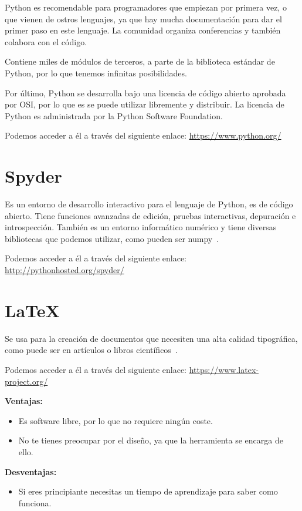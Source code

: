Python es recomendable para programadores que empiezan por primera vez, o que vienen de ostros lenguajes, ya que hay mucha documentación para dar el primer paso en este lenguaje. La comunidad organiza conferencias y también colabora con el código.

Contiene miles de módulos de terceros, a parte de la biblioteca estándar de Python, por lo que tenemos infinitas posibilidades.

Por último, Python se desarrolla bajo una licencia de código abierto aprobada por OSI, por lo que es se puede utilizar libremente y distribuir. La licencia de Python es administrada por la Python Software Foundation. 

Podemos acceder a él a través del siguiente enlace: 
\url{https://www.python.org/}

\section{Spyder}
Es un entorno de desarrollo interactivo para el lenguaje de Python, es de código abierto.
Tiene funciones avanzadas de edición, pruebas interactivas, depuración e introspección. También es un entorno informático numérico y tiene diversas bibliotecas que podemos utilizar, como pueden ser numpy~\cite{spyder}.

Podemos acceder a él a través del siguiente enlace: 
\url{http://pythonhosted.org/spyder/}

\section{\LaTeX}
Se usa para la creación de documentos que necesiten una alta calidad tipográfica, como puede ser en artículos o libros científicos~\cite{latex}.

Podemos acceder a él a través del siguiente enlace: 
\url{https://www.latex-project.org/}

\textbf{Ventajas:}
\begin{itemize}
\item Es software libre, por lo que no requiere ningún coste.
\item No te tienes preocupar por el diseño, ya que la herramienta se encarga de ello.
\end{itemize}

\textbf{Desventajas:}
\begin{itemize}
\item Si eres principiante necesitas un tiempo de aprendizaje para saber como funciona.
\end{itemize}

